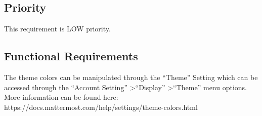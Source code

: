 \documentclass{scrreprt}
\begin{document}
\subsection{Priority}
This requirement is LOW priority.
\subsection{Functional Requirements}
The theme colors can be manipulated through the ``Theme'' Setting which can be
accessed through the ``Account Setting'' \textgreater ``Display'' \textgreater ``Theme'' menu
options.  More information can be found here:
https://docs.mattermost.com/help/settings/theme-colors.html


%
%
%
\end{document}
